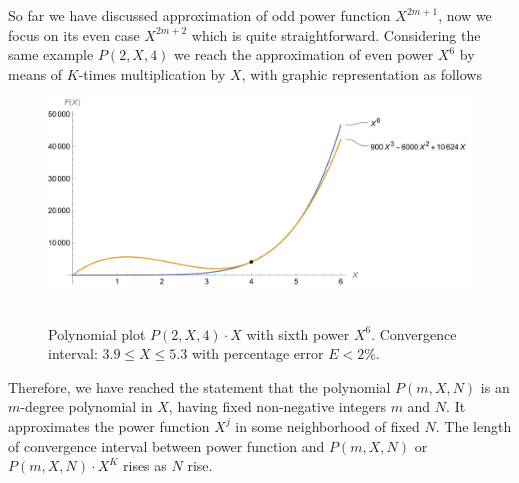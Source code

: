 So far we have discussed approximation of odd power function $X^{2m+1}$, now we focus on its even case $X^{2m+2}$
which is quite straightforward.
Considering the same example $P(2, X, 4)$ we reach the approximation of even power $X^6$
by means of $K$-times multiplication by $X$, with graphic representation as follows
\begin{figure}[H]
    \centering
    \includegraphics[width=1\textwidth]{sections/images/07_plot_of_6th_power_with_p_2_4_times_x}
    ~\caption{Polynomial plot $P(2, X, 4)\cdot X$ with sixth power $X^6$.
    Convergence interval: $3.9 \leq X \leq 5.3$ with percentage error $E < 2\%$.
    }\label{fig:07_plot_of_6th_power_with_p_2_4_times_x}
\end{figure}
Therefore, we have reached the statement that
the polynomial $P(m,X,N)$ is an $m$-degree polynomial in $X$, having fixed non-negative
integers $m$ and $N$.
It approximates the power function $X^{j}$ in some neighborhood of fixed $N$.
The length of convergence interval between power function and $P(m,X,N)$ or $P(m,X,N) \cdot X^K$ rises as $N$ rise.
